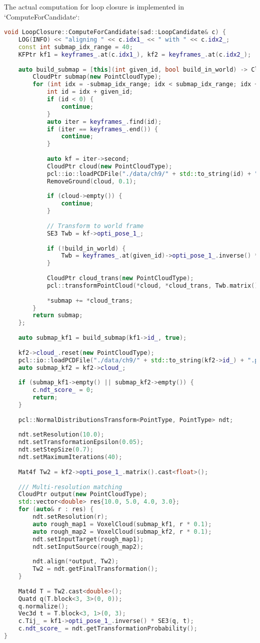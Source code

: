 The actual computation for loop closure is implemented in `ComputeForCandidate`:

\begin{lstlisting}[language=c++,caption=src/ch9/loopclosure.cc]
void LoopClosure::ComputeForCandidate(sad::LoopCandidate& c) {
	LOG(INFO) << "aligning " << c.idx1_ << " with " << c.idx2_;
	const int submap_idx_range = 40;
	KFPtr kf1 = keyframes_.at(c.idx1_), kf2 = keyframes_.at(c.idx2_);
	
	auto build_submap = [this](int given_id, bool build_in_world) -> CloudPtr {
		CloudPtr submap(new PointCloudType);
		for (int idx = -submap_idx_range; idx < submap_idx_range; idx += 4) {
			int id = idx + given_id;
			if (id < 0) {
				continue;
			}
			auto iter = keyframes_.find(id);
			if (iter == keyframes_.end()) {
				continue;
			}
			
			auto kf = iter->second;
			CloudPtr cloud(new PointCloudType);
			pcl::io::loadPCDFile("./data/ch9/" + std::to_string(id) + ".pcd", *cloud);
			RemoveGround(cloud, 0.1);
			
			if (cloud->empty()) {
				continue;
			}
			
			// Transform to world frame
			SE3 Twb = kf->opti_pose_1_;
			
			if (!build_in_world) {
				Twb = keyframes_.at(given_id)->opti_pose_1_.inverse() * Twb;
			}
			
			CloudPtr cloud_trans(new PointCloudType);
			pcl::transformPointCloud(*cloud, *cloud_trans, Twb.matrix());
			
			*submap += *cloud_trans;
		}
		return submap;
	};
	
	auto submap_kf1 = build_submap(kf1->id_, true);
	
	kf2->cloud_.reset(new PointCloudType);
	pcl::io::loadPCDFile("./data/ch9/" + std::to_string(kf2->id_) + ".pcd", *kf2->cloud_);
	auto submap_kf2 = kf2->cloud_;
	
	if (submap_kf1->empty() || submap_kf2->empty()) {
		c.ndt_score_ = 0;
		return;
	}
	
	pcl::NormalDistributionsTransform<PointType, PointType> ndt;
	
	ndt.setResolution(10.0);
	ndt.setTransformationEpsilon(0.05);
	ndt.setStepSize(0.7);
	ndt.setMaximumIterations(40);
	
	Mat4f Tw2 = kf2->opti_pose_1_.matrix().cast<float>();
	
	/// Multi-resolution matching
	CloudPtr output(new PointCloudType);
	std::vector<double> res{10.0, 5.0, 4.0, 3.0};
	for (auto& r : res) {
		ndt.setResolution(r);
		auto rough_map1 = VoxelCloud(submap_kf1, r * 0.1);
		auto rough_map2 = VoxelCloud(submap_kf2, r * 0.1);
		ndt.setInputTarget(rough_map1);
		ndt.setInputSource(rough_map2);
		
		ndt.align(*output, Tw2);
		Tw2 = ndt.getFinalTransformation();
	}
	
	Mat4d T = Tw2.cast<double>();
	Quatd q(T.block<3, 3>(0, 0));
	q.normalize();
	Vec3d t = T.block<3, 1>(0, 3);
	c.Tij_ = kf1->opti_pose_1_.inverse() * SE3(q, t);
	c.ndt_score_ = ndt.getTransformationProbability();
}
\end{lstlisting}

